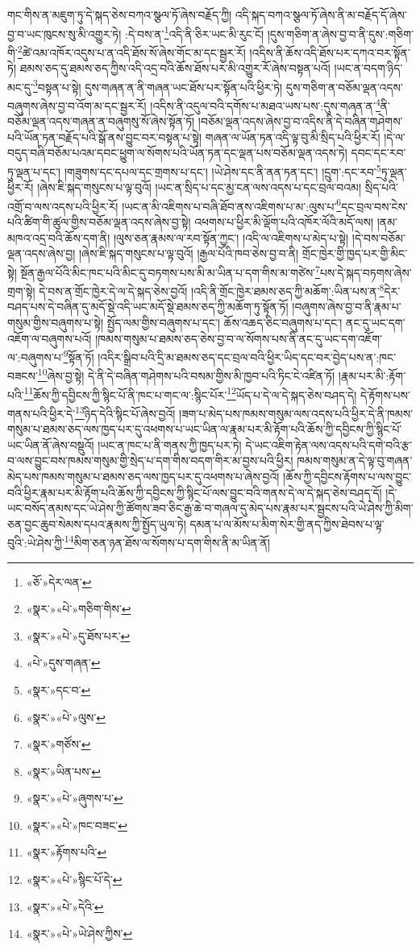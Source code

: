 གང་གིས་ན་མཇུག་ཏུ་དེ་སྐད་ཅེས་བཀའ་སྩལ་ཏོ་ཞེས་བརྗོད་ཀྱི། འདི་སྐད་བཀའ་སྩལ་ཏོ་ཞེས་ནི་མ་བརྗོད་དོ་ཞེས་བྱ་བ་ཡང་ཁུངས་སུ་མི་འགྱུར་ཏེ། :དེ་བས་ན་\footnote{«ཅོ་»དེར་ལན་}འདི་ནི་ཅིར་ཡང་མི་རུང་ངོ། །དུས་གཅིག་ན་ཞེས་བྱ་བ་ནི་དུས་:གཅིག་གི་\footnote{«སྣར་»«པེ་»གཅིག་གིས་}ཚེ་འམ་འཁོར་འདུས་པ་ན་འདི་ཐོས་སོ་ཞེས་གོང་མ་དང་སྦྱར་རོ། །འདིས་ནི་ཆོས་འདི་ཐོས་པར་དཀའ་བར་སྟོན་ཏེ། ཐམས་ཅད་དུ་ཐམས་ཅད་ཀྱིས་འདི་འདྲ་བའི་ཆོས་ཐོས་པར་མི་འགྱུར་རོ་ཞེས་བསྟན་པའོ། །ཡང་ན་བདག་ཉིད་མང་དུ་\footnote{«སྣར་»«པེ་»དུ་ཐོས་པར་}བསྟན་པ་སྟེ། དུས་གཞན་ན་ནི་གཞན་ཡང་ཐོས་པར་སྟོན་པའི་ཕྱིར་ཏེ། དུས་གཅིག་ན་བཅོམ་ལྡན་འདས་བཞུགས་ཞེས་བྱ་བ་འོག་མ་དང་སྦྱར་རོ། །འདིས་ནི་འདུལ་བའི་དགོས་པ་མཐའ་ཡས་པས་:དུས་གཞན་ན་\footnote{«པེ་»དུས་གཞན་}ནི་བཅོམ་ལྡན་འདས་གཞན་ན་བཞུགསུ་སོ་ཞེས་སྟོན་ཏོ། །བཅོམ་ལྡན་འདས་ཞེས་བྱ་བ་འདིས་ནི་དེ་བཞིན་གཤེགས་པའི་ཡོན་ཏན་བརྗོད་པའི་སྒོ་ནས་བྱུང་བར་བསྟན་པ་སྟེ། གཞན་ལ་ཡོན་ཏན་འདི་ལྟ་བུ་མི་སྲིད་པའི་ཕྱིར་རོ། །དེ་ལ་བདུད་བཞི་བཅོམ་པའམ་དབང་ཕྱུག་ལ་སོགས་པའི་ཡོན་ཏན་དང་ལྡན་པས་བཅོམ་ལྡན་འདས་ཏེ། དབང་དང་རབ་ཏུ་ལྡན་པ་དང་། །གཟུགས་དང་དཔལ་དང་གྲགས་པ་དང་། །ཡེ་ཤེས་དང་ནི་ནན་ཏན་དང་། །དྲུག་:དང་རབ་\footnote{«སྣར་»དང་བ་}ཏུ་ལྡན་ཕྱིར་རོ། །ཞེས་ཇི་སྐད་གསུངས་པ་ལྟ་བུའོ། །ཡང་ན་སྲིད་པ་དང་མྱ་ངན་ལས་འདས་པ་དང་བྲལ་བའམ། སྲིད་པའི་འགྲོ་བ་ལས་འདས་པའི་ཕྱིར་རོ། །ཡང་ན་མི་འཇིགས་པ་བཞི་ཐོབ་ནས་འཇིགས་པ་མ་:ལུས་པ་\footnote{«སྣར་»«པེ་»ལུས་}དང་བྲལ་བས་ངེས་པའི་ཚིག་གི་ཚུལ་གྱིས་བཅོམ་ལྡན་འདས་ཞེས་བྱ་སྟེ། འཕགས་པ་ཕྱིར་མི་ལྡོག་པའི་འཁོར་ལོའི་མདོ་ལས། །ནམ་མཁའ་འདྲ་བའི་ཆོས་དག་ནི། །ལུས་ཅན་རྣམས་ལ་རབ་སྟོན་ཀྱང་། །འདི་ལ་འཇིགས་པ་མེད་པ་སྟེ། །དེ་བས་བཅོམ་ལྡན་འདས་ཞེས་བྱ། །ཞེས་ཇི་སྐད་གསུངས་པ་ལྟ་བུའོ། །རྒྱལ་པོའི་ཁབ་ཅེས་བྱ་བ་ནི། གྲོང་ཁྱེར་གྱི་ཁྱད་པར་གྱི་མིང་སྟེ། སྔོན་རྒྱལ་པོའི་མིང་ཁང་པའི་མིང་དུ་བཏགས་པས་མི་མ་ཡིན་པ་དག་གིས་མ་གཙེས་\footnote{«སྣར་»གཙོས་}པས་དེ་སྐད་བཏགས་ཞེས་གྲག་སྟེ། དེ་བས་ན་གྲོང་ཁྱེར་དེ་ལ་དེ་སྐད་ཅེས་བྱའོ། །འདི་ནི་གྲོང་ཁྱེར་ཐམས་ཅད་ཀྱི་མཆོག་:ཡིན་པས་ན་\footnote{«སྣར་»ཡིན་པས་}དེར་བཤད་པས་དེ་བཞིན་དུ་མདོ་སྡེ་འདི་ཡང་མདོ་སྡེ་ཐམས་ཅད་ཀྱི་མཆོག་ཏུ་སྟོན་ཏོ། །བཞུགས་ཞེས་བྱ་བ་ནི་རྣམ་པ་གསུམ་གྱིས་བཞུགས་པ་སྟེ། སྤྱོད་ལམ་གྱིས་བཞུགས་པ་དང་། ཆོས་འཆད་ཅིང་བཞུགས་པ་དང་། ནང་དུ་ཡང་དག་འཇོག་ལ་བཞུགས་པའོ། །ཁམས་གསུམ་པ་ཐམས་ཅད་ཅེས་བྱ་བ་ལ་སོགས་པས་ནི་ནང་དུ་ཡང་དག་འཇོག་ལ་:བཞུགས་པ་\footnote{«སྣར་»«པེ་»ཞུགས་པ་}སྟོན་ཏོ། །འདིར་སྒྲིབ་པའི་དྲི་མ་ཐམས་ཅད་དང་བྲལ་བའི་ཕྱིར་ཡིད་དང་བར་བྱེད་པས་ན་:ཁང་བཟངས་\footnote{«སྣར་»«པེ་»ཁང་བཟང་}ཞེས་བྱ་སྟེ། དེ་ནི་དེ་བཞིན་གཤེགས་པའི་བསམ་གྱིས་མི་ཁྱབ་པའི་ཏིང་ངེ་འཛིན་ཏོ། །རྣམ་པར་མི་:རྟོག་པའི་\footnote{«སྣར་»རྟོགས་པའི་}ཆོས་ཀྱི་དབྱིངས་ཀྱི་སྙིང་པོ་ནི་ཁང་པ་གང་ལ་:སྙིང་པོར་\footnote{«སྣར་»«པེ་»སྙིང་པོ་དེ་}ཡོད་པ་དེ་ལ་དེ་སྐད་ཅེས་བཤད་དེ། དེ་རྟོགས་པས་གནས་པའི་ཕྱིར་དེ་\footnote{«སྣར་»«པེ་»དེའི་}ཉིད་དེའི་སྙིང་པོ་ཞེས་བྱའོ། །ཟག་པ་མེད་པས་ཁམས་གསུམ་ལས་འདས་པའི་ཕྱིར་དེ་ནི་ཁམས་གསུམ་པ་ཐམས་ཅད་ལས་ཁྱད་པར་དུ་འཕགས་པ་ཡང་ཡིན་ལ་རྣམ་པར་མི་རྟོག་པའི་ཆོས་ཀྱི་དབྱིངས་ཀྱི་སྙིང་པོ་ཡང་ཡིན་ནོ་ཞེས་བསྡུའོ། །ཡང་ན་ཁང་པ་ནི་གནས་ཀྱི་ཁྱད་པར་ཏེ། དེ་ཡང་འཇིག་རྟེན་ལས་འདས་པའི་དགེ་བའི་རྩ་བ་ལས་བྱུང་བས་ཁམས་གསུམ་གྱི་སྲེད་པ་དག་གིས་བདག་གིར་མ་བྱས་པའི་ཕྱིར། ཁམས་གསུམ་ན་དེ་ལྟ་བུ་གཞན་མེད་པས་ཁམས་གསུམ་པ་ཐམས་ཅད་ལས་ཁྱད་པར་དུ་འཕགས་པ་ཞེས་བྱའོ། །ཆོས་ཀྱི་དབྱིངས་རྟོགས་པ་ལས་བྱུང་བའི་ཕྱིར་རྣམ་པར་མི་རྟོག་པའི་ཆོས་ཀྱི་དབྱིངས་ཀྱི་སྙིང་པོ་ལས་བྱུང་བའི་གནས་དེ་ལ་དེ་སྐད་ཅེས་བཤད་དོ། །དེ་ཡང་བསོད་ནམས་དང་ཡེ་ཤེས་ཀྱི་ཚོགས་ཟབ་ཅིང་རྒྱ་ཆེ་བ་གཞལ་དུ་མེད་པས་རྣམ་པར་སྦྱངས་པའི་ཡེ་ཤེས་ཀྱི་མིག་ཅན་བྱང་ཆུབ་སེམས་དཔའ་རྣམས་ཀྱི་སྤྱོད་ཡུལ་ཏེ། དམན་པ་ལ་མོས་པ་མིག་སེར་གྱི་ནད་ཀྱིས་ཐེབས་པ་ལྟ་བུའི་:ཡེ་ཤེས་ཀྱི་\footnote{«སྣར་»«པེ་»ཡེ་ཤེས་ཀྱིས་}མིག་ཅན་ཉན་ཐོས་ལ་སོགས་པ་དག་གིས་ནི་མ་ཡིན་ནོ། 
